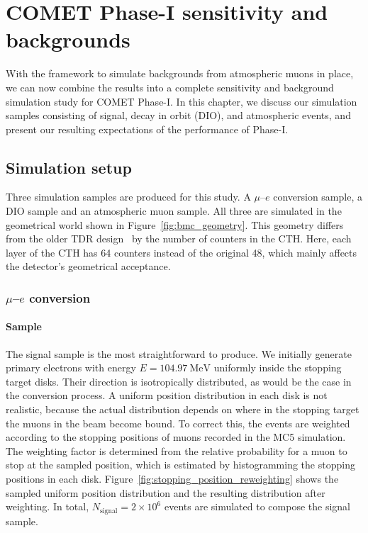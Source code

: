 \chapter{COMET Phase-I sensitivity and backgrounds}

With the framework to simulate backgrounds from atmospheric muons in place, we
can now combine the results into a complete sensitivity and background
simulation study for COMET Phase-I. In this chapter, we discuss our simulation
samples consisting of signal, decay in orbit (DIO), and atmospheric events, and
present our resulting expectations of the performance of Phase-I.

\section{Simulation setup}
Three simulation samples are produced for this study. A $\mu$--$e$ conversion
sample, a DIO sample and an atmospheric muon sample. All three are simulated in
the geometrical world shown in Figure~\ref{fig:bmc_geometry}. This geometry
differs from the older TDR design~\cite{the_comet_collaboration_comet_2020} by
the number of counters in the CTH. Here, each layer of the CTH has 64 counters
instead of the original 48, which mainly affects the detector's geometrical
acceptance.

\subsection{\texorpdfstring{$\mu$--$e$}{Muon to electron} conversion} 

\subsubsection{Sample}

The signal sample is the most straightforward to produce. We initially generate
primary electrons with energy $E=\SI{104.97}{\MeV}$ uniformly inside the
stopping target disks. Their direction is isotropically distributed, as would be
the case in the conversion process. 
A uniform position distribution in each disk is not realistic, because the
actual distribution depends on where in the stopping target the muons in the
beam become bound. To correct this, the events are weighted according to the
stopping positions of muons recorded in the MC5 simulation. The weighting factor
is determined from the relative probability for a muon to stop at the sampled
position, which is estimated by histogramming the stopping positions in each
disk. Figure~\ref{fig:stopping_position_reweighting} shows the sampled uniform
position distribution and the resulting distribution after weighting. In total,
$N_\mathrm{signal} = 2\times 10^6$ events are simulated to compose the signal
sample.

